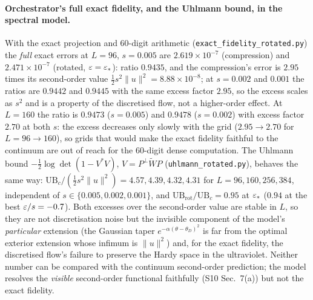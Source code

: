 \documentclass[11pt,a4paper]{article}
\begin{document}
\paragraph{Orchestrator's full exact fidelity, and the Uhlmann bound, in the spectral model.}
With the exact projection and \(60\)-digit arithmetic (\texttt{exact\_fidelity\_rotated.py}) the
\emph{full} exact errors at \(L=96\), \(s=0.005\) are \(2.619\times10^{-7}\) (compression) and
\(2.471\times10^{-7}\) (rotated, \(\varepsilon=\varepsilon_*\)): ratio \(0.9435\), and the compression's error is
\(2.95\) times its second-order value \(\frac12s^2\|u\|^2=8.88\times10^{-8}\); at \(s=0.002\) and \(0.001\)
the ratios are \(0.9442\) and \(0.9445\) with the same excess factor \(2.95\), so the excess scales as
\(s^2\) and is a property of the discretised flow, not a higher-order effect.  At \(L=160\) the ratio is
\(0.9473\) (\(s=0.005\)) and \(0.9478\) (\(s=0.002\)) with excess factor \(2.70\) at both \(s\): the excess decreases only slowly with the grid
(\(2.95\to2.70\) for \(L=96\to160\)), so grids that would make the exact fidelity faithful to the
continuum are out of reach for the \(60\)-digit dense computation.  The Uhlmann bound
\(-\frac12\log\det(1-V^*V)\), \(V=P^\perp\widetilde WP\) (\texttt{uhlmann\_rotated.py}), behaves the same way:
\(\mathrm{UB}_c/(\frac12s^2\|u\|^2)=4.57,4.39,4.32,4.31\) for \(L=96,160,256,384\), independent of
\(s\in\{0.005,0.002,0.001\}\), and \(\mathrm{UB}_{\mathrm{rot}}/\mathrm{UB}_c=0.95\) at \(\varepsilon_*\) (\(0.94\) at
the best \(\varepsilon/s=-0.7\)).  Both excesses over the second-order value are stable in \(L\), so they are
not discretisation noise but the invisible component of the model's \emph{particular} extension
(the Gaussian taper \(e^{-\alpha(\theta-\theta_D)^2}\) is far from the optimal exterior extension whose
infimum is \(\|u\|^2\)) and, for the exact fidelity, the discretised flow's failure to preserve the
Hardy space in the ultraviolet.  Neither number can be compared with the continuum second-order
prediction; the model resolves the \emph{visible} second-order functional faithfully (S10 Sec.~7(a))
but not the exact fidelity.
\end{document}
